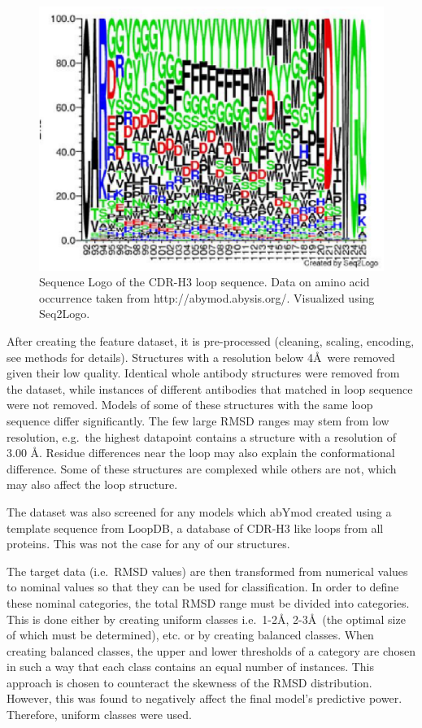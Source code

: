 \documentclass[12pt]{article}
\begin{document}
\begin{figure}
  \includegraphics[scale=0.9]{logo.eps}
  \caption {Sequence Logo of the CDR-H3 loop sequence. Data on amino
    acid occurrence taken from http://abymod.abysis.org/. Visualized
    using Seq2Logo.}
  \label{fig:logo}
\end{figure}

After creating the feature dataset, it is pre-processed (cleaning,
scaling, encoding, see methods for details). Structures with a
resolution below 4\AA\ were removed given their low quality. Identical
whole antibody structures were removed from the dataset, while
instances of different antibodies that matched in loop sequence were
not removed. Models of some of these structures with the same loop
sequence differ significantly. The few large RMSD ranges may stem from
low resolution, e.g.\ the highest datapoint contains a structure with a
resolution of 3.00 \AA.  Residue differences near the loop may also
explain the conformational difference. Some of these structures are
complexed while others are not, which may also affect the loop
structure.


The dataset was also screened for any models which abYmod created
using a template sequence from LoopDB, a database of CDR-H3 like loops
from all proteins. This was not the case for any of our structures.

The target data (i.e.\ RMSD values) are then transformed from numerical
values to nominal values so that they can be used for
classification. In order to define these nominal categories, the total
RMSD range must be divided into categories. This is done either by
creating uniform classes i.e.\ 1-2\AA, 2-3\AA\ (the optimal size of which
must be determined), etc. or by creating balanced classes. When
creating balanced classes, the upper and lower thresholds of a
category are chosen in such a way that each class contains an equal
number of instances. This approach is chosen to counteract the
skewness of the RMSD distribution. However, this was found to
negatively affect the final model's predictive power. Therefore,
uniform classes were used.
\end{document}
